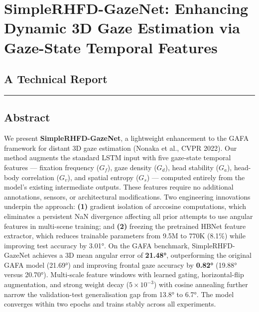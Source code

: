 \documentclass[
]{article}
\author{}
\date{}
\begin{document}
\hypertarget{simplerhfd-gazenet-enhancing-dynamic-3d-gaze-estimation-via-gaze-state-temporal-features}{%
\section{SimpleRHFD-GazeNet: Enhancing Dynamic 3D Gaze Estimation via
Gaze-State Temporal
Features}\label{simplerhfd-gazenet-enhancing-dynamic-3d-gaze-estimation-via-gaze-state-temporal-features}}

\hypertarget{a-technical-report}{%
\subsection{A Technical Report}\label{a-technical-report}}

\begin{center}\rule{0.5\linewidth}{0.5pt}\end{center}

\hypertarget{abstract}{%
\subsection{Abstract}\label{abstract}}

We present \textbf{SimpleRHFD-GazeNet}, a lightweight enhancement to the
GAFA framework for distant 3D gaze estimation (Nonaka et al., CVPR
2022). Our method augments the standard LSTM input with five gaze-state
temporal features --- fixation frequency (\(G_f\)), gaze density
(\(G_d\)), head stability (\(G_a\)), head-body correlation (\(G_v\)),
and spatial entropy (\(G_s\)) --- computed entirely from the model's
existing intermediate outputs. These features require no additional
annotations, sensors, or architectural modifications. Two engineering
innovations underpin the approach: \textbf{(1)} gradient isolation of
arccosine computations, which eliminates a persistent NaN divergence
affecting all prior attempts to use angular features in multi-scene
training; and \textbf{(2)} freezing the pretrained HBNet feature
extractor, which reduces trainable parameters from 9.5M to 770K (8.1\%)
while improving test accuracy by 3.01°. On the GAFA benchmark,
SimpleRHFD-GazeNet achieves a 3D mean angular error of \textbf{21.48°},
outperforming the original GAFA model (21.69°) and improving frontal
gaze accuracy by \textbf{0.82°} (19.88° versus 20.70°). Multi-scale
feature windows with learned gating, horizontal-flip augmentation, and
strong weight decay (\(5 \times 10^{-3}\)) with cosine annealing further
narrow the validation-test generalisation gap from 13.8° to 6.7°. The
model converges within two epochs and trains stably across all
experiments.
\end{document}
